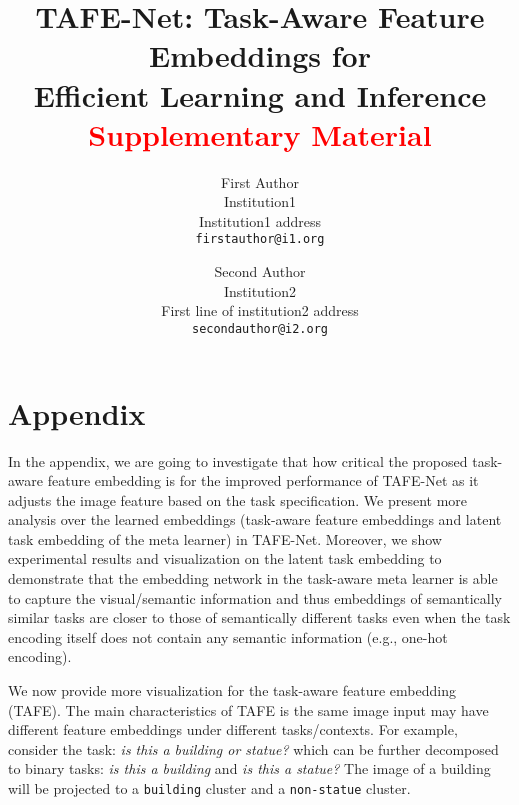 \documentclass[10pt,twocolumn,letterpaper]{article}
\newcommand{\model}{TAFE-Net\xspace}
\begin{document}
\title{TAFE-Net: Task-Aware Feature Embeddings for \\ Efficient Learning and Inference \\
\textcolor{red}{\large Supplementary Material}}

\author{First Author\\
Institution1\\
Institution1 address\\
{\tt\small firstauthor@i1.org}
\and
Second Author\\
Institution2\\
First line of institution2 address\\
{\tt\small secondauthor@i2.org}
}

\maketitle

\section*{Appendix}
In the appendix, we are going to investigate that how critical the proposed task-aware feature embedding is for the improved
performance of \model as it adjusts the image feature based on the task 
specification. We present more analysis over the learned embeddings (task-aware feature embeddings and latent task embedding of the meta learner) in \model. Moreover, 
we show experimental results  and visualization on the latent task embedding to demonstrate that the 
embedding network in the task-aware meta learner is able to capture the visual/semantic
information and thus embeddings of semantically similar tasks are closer 
to those of semantically different tasks even when the task encoding itself does 
not contain any semantic information (e.g., one-hot encoding). 

We now provide more visualization for the task-aware feature embedding (TAFE). 
The main characteristics of TAFE is the same image input may have different feature 
embeddings under different tasks/contexts. For example, consider the task: 
\textit{is this a building or statue?} which can be further decomposed to binary tasks:
\textit{is this a building} and \textit{is this a statue?} The image of a 
building
will be projected to a \texttt{building} cluster and a \texttt{non-statue} cluster. 
\end{document}
